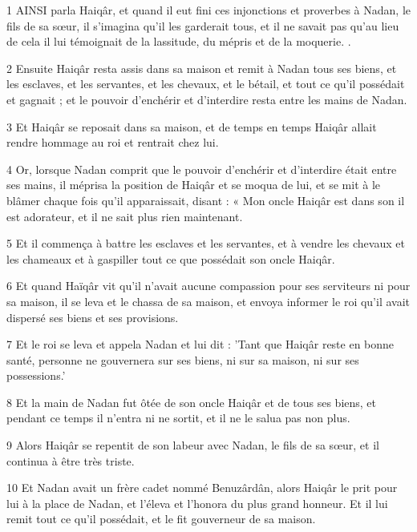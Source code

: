 \par 1 AINSI parla Haiqâr, et quand il eut fini ces injonctions et proverbes à Nadan, le fils de sa sœur, il s'imagina qu'il les garderait tous, et il ne savait pas qu'au lieu de cela il lui témoignait de la lassitude, du mépris et de la moquerie. .

\par 2 Ensuite Haiqâr resta assis dans sa maison et remit à Nadan tous ses biens, et les esclaves, et les servantes, et les chevaux, et le bétail, et tout ce qu'il possédait et gagnait ; et le pouvoir d'enchérir et d'interdire resta entre les mains de Nadan.

\par 3 Et Haiqâr se reposait dans sa maison, et de temps en temps Haiqâr allait rendre hommage au roi et rentrait chez lui.

\par 4 Or, lorsque Nadan comprit que le pouvoir d'enchérir et d'interdire était entre ses mains, il méprisa la position de Haiqâr et se moqua de lui, et se mit à le blâmer chaque fois qu'il apparaissait, disant : « Mon oncle Haiqâr est dans son il est adorateur, et il ne sait plus rien maintenant.

\par 5 Et il commença à battre les esclaves et les servantes, et à vendre les chevaux et les chameaux et à gaspiller tout ce que possédait son oncle Haiqâr.

\par 6 Et quand Haïqâr vit qu'il n'avait aucune compassion pour ses serviteurs ni pour sa maison, il se leva et le chassa de sa maison, et envoya informer le roi qu'il avait dispersé ses biens et ses provisions.

\par 7 Et le roi se leva et appela Nadan et lui dit : 'Tant que Haiqâr reste en bonne santé, personne ne gouvernera sur ses biens, ni sur sa maison, ni sur ses possessions.'

\par 8 Et la main de Nadan fut ôtée de son oncle Haiqâr et de tous ses biens, et pendant ce temps il n'entra ni ne sortit, et il ne le salua pas non plus.

\par 9 Alors Haiqâr se repentit de son labeur avec Nadan, le fils de sa sœur, et il continua à être très triste.

\par 10 Et Nadan avait un frère cadet nommé Benuzârdân, alors Haiqâr le prit pour lui à la place de Nadan, et l'éleva et l'honora du plus grand honneur. Et il lui remit tout ce qu'il possédait, et le fit gouverneur de sa maison.

